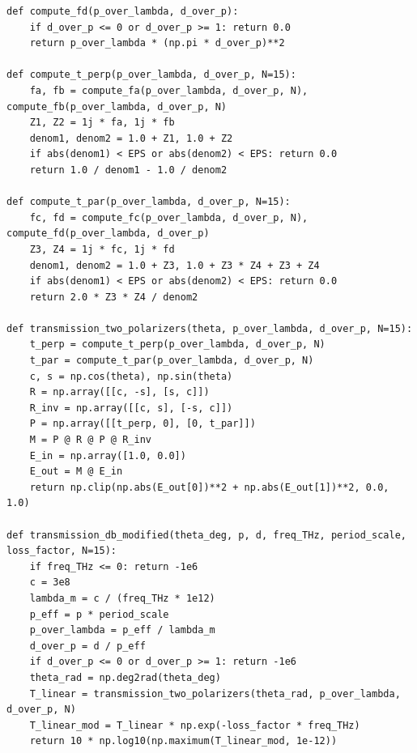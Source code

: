 \begin{verbatim}
def compute_fd(p_over_lambda, d_over_p):
    if d_over_p <= 0 or d_over_p >= 1: return 0.0
    return p_over_lambda * (np.pi * d_over_p)**2

def compute_t_perp(p_over_lambda, d_over_p, N=15):
    fa, fb = compute_fa(p_over_lambda, d_over_p, N), compute_fb(p_over_lambda, d_over_p, N)
    Z1, Z2 = 1j * fa, 1j * fb
    denom1, denom2 = 1.0 + Z1, 1.0 + Z2
    if abs(denom1) < EPS or abs(denom2) < EPS: return 0.0
    return 1.0 / denom1 - 1.0 / denom2

def compute_t_par(p_over_lambda, d_over_p, N=15):
    fc, fd = compute_fc(p_over_lambda, d_over_p, N), compute_fd(p_over_lambda, d_over_p)
    Z3, Z4 = 1j * fc, 1j * fd
    denom1, denom2 = 1.0 + Z3, 1.0 + Z3 * Z4 + Z3 + Z4
    if abs(denom1) < EPS or abs(denom2) < EPS: return 0.0
    return 2.0 * Z3 * Z4 / denom2

def transmission_two_polarizers(theta, p_over_lambda, d_over_p, N=15):
    t_perp = compute_t_perp(p_over_lambda, d_over_p, N)
    t_par = compute_t_par(p_over_lambda, d_over_p, N)
    c, s = np.cos(theta), np.sin(theta)
    R = np.array([[c, -s], [s, c]])
    R_inv = np.array([[c, s], [-s, c]])
    P = np.array([[t_perp, 0], [0, t_par]])
    M = P @ R @ P @ R_inv
    E_in = np.array([1.0, 0.0])
    E_out = M @ E_in
    return np.clip(np.abs(E_out[0])**2 + np.abs(E_out[1])**2, 0.0, 1.0)

def transmission_db_modified(theta_deg, p, d, freq_THz, period_scale, loss_factor, N=15):
    if freq_THz <= 0: return -1e6
    c = 3e8
    lambda_m = c / (freq_THz * 1e12)
    p_eff = p * period_scale
    p_over_lambda = p_eff / lambda_m
    d_over_p = d / p_eff
    if d_over_p <= 0 or d_over_p >= 1: return -1e6
    theta_rad = np.deg2rad(theta_deg)
    T_linear = transmission_two_polarizers(theta_rad, p_over_lambda, d_over_p, N)
    T_linear_mod = T_linear * np.exp(-loss_factor * freq_THz)
    return 10 * np.log10(np.maximum(T_linear_mod, 1e-12))
\end{verbatim}

